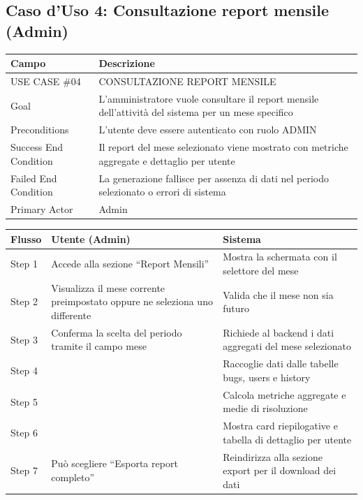 ﻿\documentclass[a4paper,11pt]{article}
\begin{document}
\subsection{Caso d'Uso 4: Consultazione report mensile (Admin)}

\begin{tabular}{|p{3cm}|p{11cm}|}
\hline
\textbf{Campo} & \textbf{Descrizione} \\
\hline
USE CASE \#04 & CONSULTAZIONE REPORT MENSILE \\
\hline
Goal & L'amministratore vuole consultare il report mensile dell'attivit\`a del sistema per un mese specifico \\
\hline
Preconditions & L'utente deve essere autenticato con ruolo ADMIN \\
\hline
Success End Condition & Il report del mese selezionato viene mostrato con metriche aggregate e dettaglio per utente \\
\hline
Failed End Condition & La generazione fallisce per assenza di dati nel periodo selezionato o errori di sistema \\
\hline
Primary Actor & Admin \\
\hline
\end{tabular}

\vspace{0.5cm}

\begin{tabular}{|p{2cm}|p{5.5cm}|p{6.5cm}|}
\hline
\textbf{Flusso} & \textbf{Utente (Admin)} & \textbf{Sistema} \\
\hline
Step 1 & Accede alla sezione ``Report Mensili'' & Mostra la schermata con il selettore del mese \\
\hline
Step 2 & Visualizza il mese corrente preimpostato oppure ne seleziona uno differente & Valida che il mese non sia futuro \\
\hline
Step 3 & Conferma la scelta del periodo tramite il campo mese & Richiede al backend i dati aggregati del mese selezionato \\
\hline
Step 4 & & Raccoglie dati dalle tabelle bugs, users e history \\
\hline
Step 5 & & Calcola metriche aggregate e medie di risoluzione \\
\hline
Step 6 & & Mostra card riepilogative e tabella di dettaglio per utente \\
\hline
Step 7 & Pu\`o scegliere ``Esporta report completo'' & Reindirizza alla sezione export per il download dei dati \\
\hline
\end{tabular}
\end{document}
